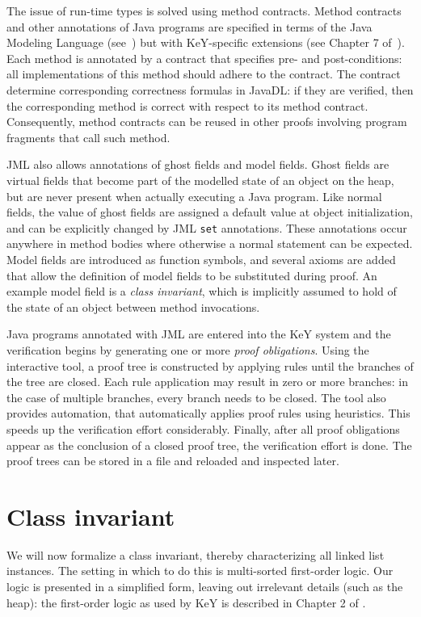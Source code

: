 \documentclass[runningheads]{llncs}
\begin{document}
The issue of run-time types is solved using method contracts. Method contracts and other annotations of Java programs are specified in terms of the Java Modeling Language (see~\cite{leavens2013jml}) but with KeY-specific extensions (see Chapter 7 of~\cite{KeYbook}). Each method is annotated by a contract that specifies pre- and post-conditions: all implementations of this method should adhere to the contract. The contract determine corresponding correctness formulas in JavaDL: if they are verified, then the corresponding method is correct with respect to its method contract. Consequently, method contracts can be reused in other proofs involving program fragments that call such method.

JML also allows annotations of ghost fields and model fields. Ghost fields are virtual fields that become part of the modelled state of an object on the heap, but are never present when actually executing a Java program. Like normal fields, the value of ghost fields are assigned a default value at object initialization, and can be explicitly changed by JML \texttt{set} annotations. These annotations occur anywhere in method bodies where otherwise a normal statement can be expected. Model fields are introduced as function symbols, and several axioms are added that allow the definition of model fields to be substituted during proof. An example model field is a \emph{class invariant}, which is implicitly assumed to hold of the state of an object between method invocations.

Java programs annotated with JML are entered into the KeY system and the verification begins by generating one or more \emph{proof obligations}. Using the interactive tool, a proof tree is constructed by applying rules until the branches of the tree are closed. Each rule application may result in zero or more branches: in the case of multiple branches, every branch needs to be closed. The tool also provides automation, that automatically applies proof rules using heuristics. This speeds up the verification effort considerably. Finally, after all proof obligations appear as the conclusion of a closed proof tree, the verification effort is done. The proof trees can be stored in a file and reloaded and inspected later.

\section{Class invariant}\label{sec:class-invariant}

We will now formalize a class invariant, thereby characterizing all linked list instances. The setting in which to do this is multi-sorted first-order logic. Our logic is presented in a simplified form, leaving out irrelevant details (such as the heap): the first-order logic as used by KeY is described in Chapter 2 of \cite{KeYbook}.
\end{document}
